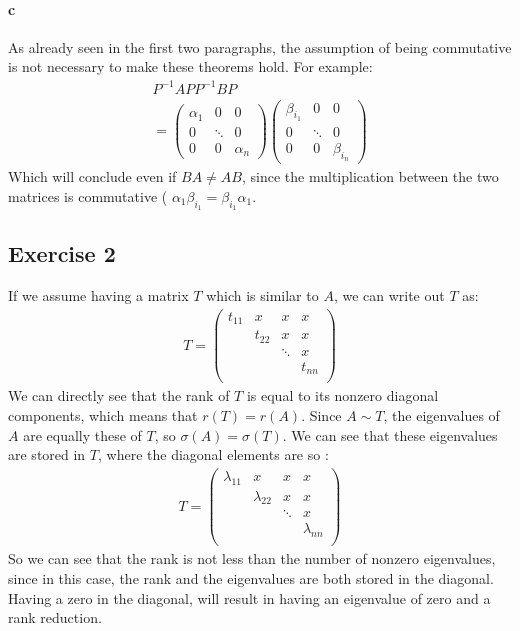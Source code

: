 \paragraph{c}
As already seen in the first two paragraphs, the assumption of being commutative is not necessary to make these theorems hold. For example:
\begin{gather*}
P^{-1}A P P^{-1} B P\\
= \left( \begin{array}{ccc}
\alpha_1 & 0 & 0 \\
0 & \ddots & 0\\
0 & 0 & \alpha_n 
\end{array} \right)
\left( \begin{array}{ccc}
\beta_{i_1} & 0 & 0\\
0 & \ddots & 0 \\
0 & 0 & \beta_{i_n}
\end{array} \right) 
\end{gather*}
Which will conclude even if $BA \neq AB$, since the multiplication between the two matrices is commutative ( $\alpha_1 \beta_{i_1} = \beta_{i_1} \alpha_1$.
\subsection{Exercise 2}
If we assume having a matrix $T$ which is similar to $A$, we can write out $T$ as:
\begin{gather*}
T = \left( \begin{array}{cccc}
t_{11} & x & x &x\\
&t_{22}  & x &x\\
&  & \ddots &x\\
&  &  &t_{nn}\\
\end{array}\right) 
\end{gather*}
We can directly see that the rank of $T$ is equal to its nonzero diagonal components, which means that $r(T) = r(A)$.
Since $A \sim T$, the eigenvalues of $A$ are equally these of $T$, so $\sigma(A) = \sigma(T)$. We can see that these eigenvalues are stored in $T$, where the diagonal elements are so :
\begin{gather*}
T = \left( \begin{array}{cccc}
\lambda_{11} & x & x &x\\
& \lambda_{22}  & x &x\\
&  & \ddots &x\\
&  &  & \lambda_{nn}\\
\end{array} \right)
\end{gather*}
So we can see that the rank is not less than the number of nonzero eigenvalues, since in this case, the rank and the eigenvalues are both stored in the diagonal. Having a zero in the diagonal, will result in having an eigenvalue of zero and a rank reduction.
